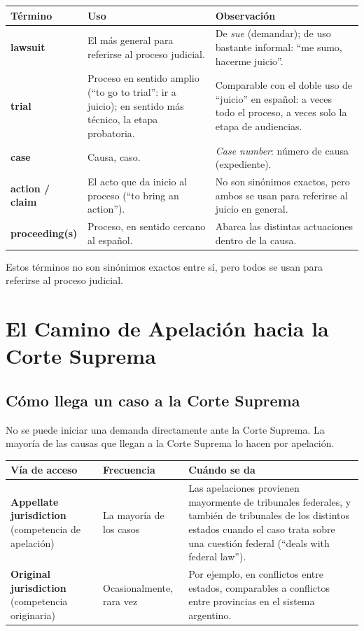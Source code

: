 \documentclass[12pt,oneside]{book}
\begin{document}
\begin{table}[H]
\centering
\begin{tabularx}{\textwidth}{p{2.5cm} X X}
\toprule
\textbf{Término} & \textbf{Uso} & \textbf{Observación} \\
\midrule
\textbf{lawsuit} & El más general para referirse al proceso judicial. & De \textit{sue} (demandar); de uso bastante informal: ``me sumo, hacerme juicio''. \\
\midrule
\textbf{trial} & Proceso en sentido amplio (``to go to trial'': ir a juicio); en sentido más técnico, la etapa probatoria. & Comparable con el doble uso de ``juicio'' en español: a veces todo el proceso, a veces solo la etapa de audiencias. \\
\midrule
\textbf{case} & Causa, caso. & \textit{Case number}: número de causa (expediente). \\
\midrule
\textbf{action / claim} & El acto que da inicio al proceso (``to bring an action''). & No son sinónimos exactos, pero ambos se usan para referirse al juicio en general. \\
\midrule
\textbf{proceeding(s)} & Proceso, en sentido cercano al español. & Abarca las distintas actuaciones dentro de la causa. \\
\bottomrule
\end{tabularx}
\end{table}

Estos términos no son sinónimos exactos entre sí, pero todos se usan para referirse al proceso judicial.

\section{El Camino de Apelación hacia la Corte Suprema}

\subsection{Cómo llega un caso a la Corte Suprema}

No se puede iniciar una demanda directamente ante la Corte Suprema. La mayoría de las causas que llegan a la Corte Suprema lo hacen por apelación.

\begin{table}[H]
\centering
\begin{tabularx}{\textwidth}{p{3.5cm} p{2.5cm} X}
\toprule
\textbf{Vía de acceso} & \textbf{Frecuencia} & \textbf{Cuándo se da} \\
\midrule
\textbf{Appellate jurisdiction} (competencia de apelación) & La mayoría de los casos & Las apelaciones provienen mayormente de tribunales federales, y también de tribunales de los distintos estados cuando el caso trata sobre una cuestión federal (``deals with federal law''). \\
\midrule
\textbf{Original jurisdiction} (competencia originaria) & Ocasionalmente, rara vez & Por ejemplo, en conflictos entre estados, comparables a conflictos entre provincias en el sistema argentino. \\
\bottomrule
\end{tabularx}
\end{table}
\end{document}
